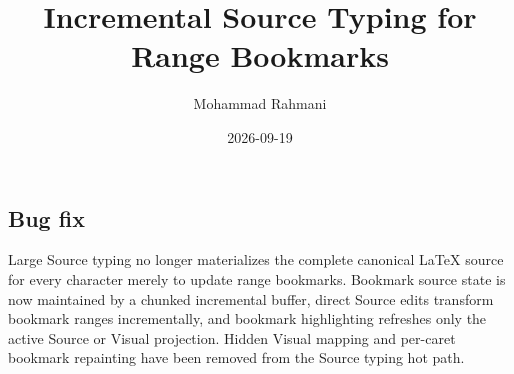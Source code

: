 \documentclass[a4paper]{article}
\title{Incremental Source Typing for Range Bookmarks}
\date{2026-09-19}
\author{Mohammad Rahmani}
\begin{document}
\maketitle
\begin{preview}
\section{Bug fix}
Large Source typing no longer materializes the complete canonical LaTeX source
for every character merely to update range bookmarks. Bookmark source state is
now maintained by a chunked incremental buffer, direct Source edits transform
bookmark ranges incrementally, and bookmark highlighting refreshes only the
active Source or Visual projection. Hidden Visual mapping and per-caret
bookmark repainting have been removed from the Source typing hot path.
\end{preview}
\end{document}

